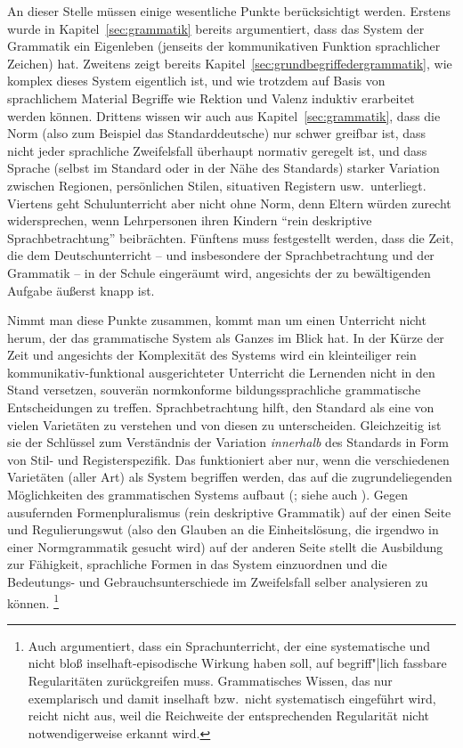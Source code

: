 An dieser Stelle müssen einige wesentliche Punkte berücksichtigt werden.
Erstens wurde in Kapitel~\ref{sec:grammatik} bereits argumentiert, dass das System der Grammatik ein Eigenleben (jenseits der kommunikativen Funktion sprachlicher Zeichen) hat.
Zweitens zeigt bereits Kapitel~\ref{sec:grundbegriffedergrammatik}, wie komplex dieses System eigentlich ist, und wie trotzdem auf Basis von sprachlichem Material Begriffe wie Rektion und Valenz induktiv erarbeitet werden können.
Drittens wissen wir auch aus Kapitel~\ref{sec:grammatik}, dass die Norm (also zum Beispiel das Standarddeutsche) nur schwer greifbar ist, dass nicht jeder sprachliche Zweifelsfall überhaupt normativ geregelt ist, und dass Sprache (selbst im Standard oder in der Nähe des Standards) starker Variation zwischen Regionen, persönlichen Stilen, situativen Registern usw.\ unterliegt.
Viertens geht Schulunterricht aber nicht ohne Norm, denn Eltern würden zurecht widersprechen, wenn Lehrpersonen ihren Kindern "`rein deskriptive Sprachbetrachtung"' beibrächten.
Fünftens muss festgestellt werden, dass die Zeit, die dem Deutschunterricht -- und insbesondere der Sprachbetrachtung und der Grammatik -- in der Schule eingeräumt wird, angesichts der zu bewältigenden Aufgabe äußerst knapp ist.

Nimmt man diese Punkte zusammen, kommt man um einen Unterricht nicht herum, der das grammatische System als Ganzes im Blick hat.
In der Kürze der Zeit und angesichts der Komplexität des Systems wird ein kleinteiliger rein kommunikativ-funktional ausgerichteter Unterricht die Lernenden nicht in den Stand versetzen, souverän normkonforme bildungssprachliche grammatische Entscheidungen zu treffen.
Sprachbetrachtung hilft, den Standard als eine von vielen Varietäten zu verstehen und von diesen zu unterscheiden.
Gleichzeitig ist sie der Schlüssel zum Verständnis der Variation \textit{innerhalb} des Standards in Form von Stil- und Registerspezifik.
Das funktioniert aber nur, wenn die verschiedenen Varietäten (aller Art) als System begriffen werden, das auf die zugrundeliegenden Möglichkeiten des grammatischen Systems aufbaut (\citealt[10--11]{Eisenberg2004}; siehe auch \citealt[10]{Menzel2017}).
Gegen ausufernden Formenpluralismus (rein deskriptive Grammatik) auf der einen Seite und Regulierungswut (also den Glauben an die Einheitslösung, die irgendwo in einer Normgrammatik gesucht wird) auf der anderen Seite stellt \citet[8--9]{Eisenberg2004} die Ausbildung zur Fähigkeit, sprachliche Formen in das System einzuordnen und die Bedeutungs- und Gebrauchsunterschiede im Zweifelsfall selber analysieren zu können.%
\footnote{Auch \citet[80--83]{Portmanntselikas2011} argumentiert, dass ein Sprachunterricht, der eine systematische und nicht bloß inselhaft-episodische Wirkung haben soll, auf begriff"|lich fassbare Regularitäten zurückgreifen muss.
Grammatisches Wissen, das nur exemplarisch und damit inselhaft bzw.\ nicht systematisch eingeführt wird, reicht nicht aus, weil die Reichweite der entsprechenden Regularität nicht notwendigerweise erkannt wird.}

